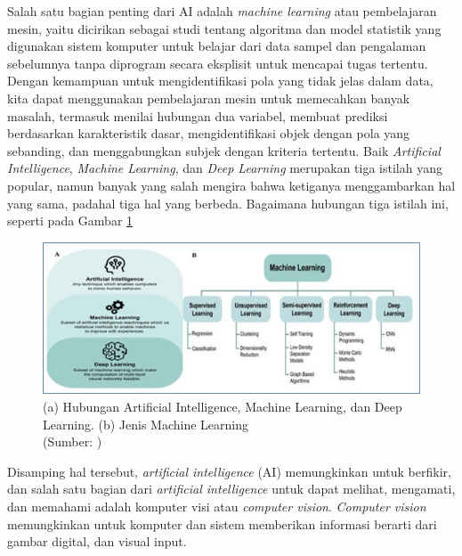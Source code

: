Salah satu bagian penting dari AI adalah \textit{machine learning} atau pembelajaran mesin, yaitu dicirikan sebagai studi tentang algoritma dan model statistik yang digunakan sistem komputer untuk belajar dari data sampel dan pengalaman sebelumnya tanpa diprogram secara eksplisit untuk mencapai tugas tertentu. Dengan kemampuan untuk mengidentifikasi pola yang tidak jelas dalam data, kita dapat menggunakan pembelajaran mesin untuk memecahkan banyak masalah, termasuk menilai hubungan dua variabel, membuat prediksi berdasarkan karakteristik dasar, mengidentifikasi objek dengan pola yang sebanding, dan menggabungkan subjek dengan kriteria tertentu. Baik \textit{Artificial Intelligence}, \textit{Machine Learning}, dan \textit{Deep Learning} merupakan tiga istilah yang popular, namun banyak yang salah mengira bahwa ketiganya menggambarkan hal yang sama, padahal tiga hal yang berbeda. Bagaimana hubungan tiga istilah ini, seperti pada Gambar \ref{img:Hubungan-Artificial-Intelligence}

\begin{figure}[H]
	\vspace{-0.1cm}
	\begin{center}
		\includegraphics[width=1\columnwidth]{bab2/Gambar/Picture1.jpg}
	\end{center}
	\vspace{-0.2cm}
	\caption{(a) Hubungan Artificial Intelligence, Machine Learning, dan Deep Learning. (b) Jenis Machine Learning\\(Sumber: )}\label{img:Hubungan-Artificial-Intelligence}
\end{figure}

Disamping hal tersebut, \textit{artificial intelligence} (AI) memungkinkan untuk berfikir, dan salah satu bagian dari \textit{artificial intelligence} untuk dapat melihat, mengamati, dan memahami adalah komputer visi atau \textit{computer vision}. \textit{Computer vision} memungkinkan untuk komputer dan sistem memberikan informasi berarti dari gambar digital, dan visual input. 

